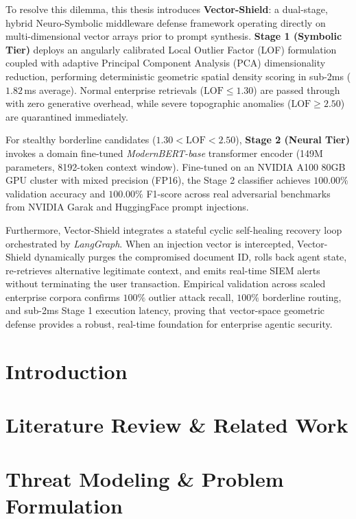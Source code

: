 \documentclass[a4paper, 12pt]{report}
\theoremstyle{definition}
\begin{document}
To resolve this dilemma, this thesis introduces \textbf{Vector-Shield}: a dual-stage, hybrid Neuro-Symbolic middleware defense framework operating directly on multi-dimensional vector arrays prior to prompt synthesis. \textbf{Stage 1 (Symbolic Tier)} deploys an angularly calibrated Local Outlier Factor (LOF) formulation coupled with adaptive Principal Component Analysis (PCA) dimensionality reduction, performing deterministic geometric spatial density scoring in sub-2ms ($1.82$\,ms average). Normal enterprise retrievals ($\text{LOF} \le 1.30$) are passed through with zero generative overhead, while severe topographic anomalies ($\text{LOF} \ge 2.50$) are quarantined immediately.

For stealthy borderline candidates ($1.30 < \text{LOF} < 2.50$), \textbf{Stage 2 (Neural Tier)} invokes a domain fine-tuned \textit{ModernBERT-base} transformer encoder (149M parameters, 8192-token context window). Fine-tuned on an NVIDIA A100 80GB GPU cluster with mixed precision (FP16), the Stage 2 classifier achieves $100.00\%$ validation accuracy and $100.00\%$ F1-score across real adversarial benchmarks from NVIDIA Garak and HuggingFace prompt injections.

Furthermore, Vector-Shield integrates a stateful cyclic self-healing recovery loop orchestrated by \textit{LangGraph}. When an injection vector is intercepted, Vector-Shield dynamically purges the compromised document ID, rolls back agent state, re-retrieves alternative legitimate context, and emits real-time SIEM alerts without terminating the user transaction. Empirical validation across scaled enterprise corpora confirms $100\%$ outlier attack recall, $100\%$ borderline routing, and sub-2ms Stage 1 execution latency, proving that vector-space geometric defense provides a robust, real-time foundation for enterprise agentic security.

\clearpage
{}
\setcounter{page}{1}

\chapter{Introduction}


\chapter{Literature Review \& Related Work}


\chapter{Threat Modeling \& Problem Formulation}

\end{document}
